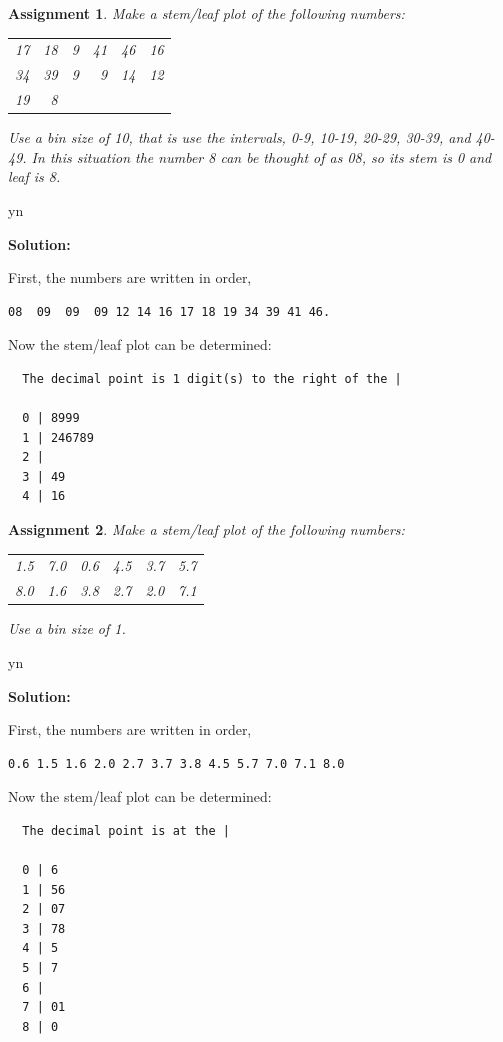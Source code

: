 \documentclass[12pt]{article}
\def\solutions{y}
\def\solutions{n}
\newtheorem{assignment}{Assignment}[section]
\begin{document}
\begin{assignment}
  Make a stem/leaf plot of the following numbers:
  \begin{center}
    \begin{tabular}{rrrrrr}
      17 & 18 & 9 & 41 & 46 & 16 \\
      34 & 39 & 9 & 9  & 14 & 12 \\
      19 & 8      
    \end{tabular}
  \end{center}
  Use a bin size of 10, that is use the intervals, 0-9, 10-19, 20-29,
  30-39, and 40-49. In this situation the number 8 can be thought of
  as 08, so its stem is 0 and leaf is 8.
\end{assignment}

\if y\solutions

\textbf{Solution:}

First, the numbers are written in order,
\begin{verbatim}
08  09  09  09 12 14 16 17 18 19 34 39 41 46.
\end{verbatim}

Now the stem/leaf plot can be determined:
\begin{verbatim}
  The decimal point is 1 digit(s) to the right of the |

  0 | 8999
  1 | 246789
  2 | 
  3 | 49
  4 | 16
\end{verbatim}

\fi

\begin{assignment}
  Make a stem/leaf plot of the following numbers:
  \begin{center}
    \begin{tabular}{rrrrrr}
       1.5 & 7.0 & 0.6 & 4.5 & 3.7 & 5.7 \\
       8.0 & 1.6 & 3.8 & 2.7 & 2.0 & 7.1
    \end{tabular}
  \end{center}
  Use a bin size of 1.
\end{assignment}

\if y\solutions

\textbf{Solution:}

First, the numbers are written in order,
\begin{verbatim}
0.6 1.5 1.6 2.0 2.7 3.7 3.8 4.5 5.7 7.0 7.1 8.0
\end{verbatim}

Now the stem/leaf plot can be determined:
\begin{verbatim}
  The decimal point is at the |

  0 | 6
  1 | 56
  2 | 07
  3 | 78
  4 | 5
  5 | 7
  6 |
  7 | 01
  8 | 0

\end{verbatim}
\end{document}
